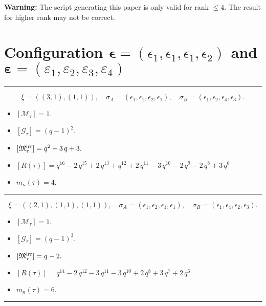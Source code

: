 \documentclass[10pt,a4paper]{amsart}
\begin{document}
\textbf{Warning: }The script generating this paper is only valid for rank $\leq 4$. The result for higher rank may not be correct.

\newpage{}


\section{Configuration $\bm{\epsilon} = (\epsilon_1,\epsilon_1,\epsilon_1,\epsilon_2)$ and $\bm{\varepsilon} =(\varepsilon_1,\varepsilon_2,\varepsilon_3,\varepsilon_4)$}
\noindent\rule{8cm}{0.4pt}

$$\xi = ({(3, 1), (1, 1)}),\quad \sigma_A = ({{\epsilon_1, \epsilon_1, \epsilon_2}, {\epsilon_1}}),\quad \sigma_B = ({{\epsilon_1, \epsilon_2, \epsilon_4}, {\epsilon_3}}).$$

\begin{itemize}
 \item $[\mathcal{M}_{\tau}] = 1 .$

 \item $[\mathcal{G}_{\tau}] = {\left(q - 1\right)}^{2} .$

 \item $[{\frak M}_{\tau}^{\textrm{irr}}] = q^{2} - 3 \, q + 3 .$

 \item $[R(\tau)] = q^{16} - 2 \, q^{15} + 2 \, q^{13} + q^{12} + 2 \, q^{11} - 3 \, q^{10} - 2 \, q^{9} - 2 \, q^{8} + 3 \, q^{6} $

 \item $m_{\kappa}(\tau) = 4 .$

 \end{itemize}
\noindent\rule{8cm}{0.4pt}

$$\xi = ({(2, 1), (1, 1), (1, 1)}),\quad \sigma_A = ({{\epsilon_1, \epsilon_2}, {\epsilon_1}, {\epsilon_1}}),\quad \sigma_B = ({{\epsilon_1, \epsilon_4}, {\epsilon_2}, {\epsilon_3}}).$$

\begin{itemize}
 \item $[\mathcal{M}_{\tau}] = 1 .$

 \item $[\mathcal{G}_{\tau}] = {\left(q - 1\right)}^{3} .$

 \item $[{\frak M}_{\tau}^{\textrm{irr}}] = q - 2 .$

 \item $[R(\tau)] = q^{14} - 2 \, q^{12} - 3 \, q^{11} - 3 \, q^{10} + 2 \, q^{8} + 3 \, q^{7} + 2 \, q^{6} $

 \item $m_{\kappa}(\tau) = 6 .$

 \end{itemize}
\noindent\rule{8cm}{0.4pt}
\end{document}
